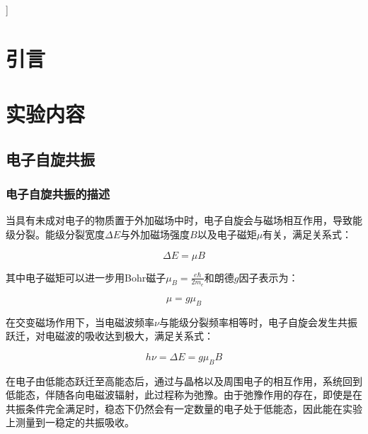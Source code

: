 \documentclass{thuemp}
\begin{document}
    ]
    \wuhao 
    
    \section{引言}
    \enlargethispage{-3.3cm}

    
    
    \section{实验内容}
    
    \subsection{电子自旋共振}
    
    \subsubsection{电子自旋共振的描述}
    
    当具有未成对电子的物质置于外加磁场中时，电子自旋会与磁场相互作用，导致能级分裂。能级分裂宽度$\Delta E$与外加磁场强度$B$以及电子磁矩$\mu$有关，满足关系式：
    
    \begin{equation}
    \Delta E = \mu B
    \end{equation}
    
    其中电子磁矩可以进一步用Bohr磁子$\mu_B = \frac{e\hbar}{2m_e}$和朗德$g$因子表示为：
    
    \begin{equation}
    \mu = g \mu_B
    \end{equation}
    
    在交变磁场作用下，当电磁波频率$\nu$与能级分裂频率相等时，电子自旋会发生共振跃迁，对电磁波的吸收达到极大，满足关系式：
    
    \begin{equation}
    h \nu  = \Delta E = g \mu_B B
    \end{equation}
    
    在电子由低能态跃迁至高能态后，通过与晶格以及周围电子的相互作用，系统回到低能态，伴随各向电磁波辐射，此过程称为弛豫。由于弛豫作用的存在，即使是在共振条件完全满足时，稳态下仍然会有一定数量的电子处于低能态，因此能在实验上测量到一稳定的共振吸收。
    
\end{document}
